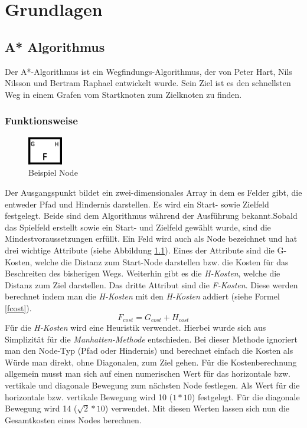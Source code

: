 \chapter{Grundlagen}
\section{A* Algorithmus}
Der A*-Algorithmus ist ein Wegfindungs-Algorithmus, der von Peter Hart, Nils Nilsson und Bertram Raphael entwickelt wurde. Sein Ziel ist es den schnellsten Weg in einem Grafen vom Startknoten zum Zielknoten zu finden. 
\subsection{Funktionsweise}
\begin{figure}
    \includegraphics[width=1.5cm]{assets/aStarNode.png}
    \caption{Beispiel Node}
    \label{fig:aStarNode}
\end{figure}
Der Ausgangspunkt bildet ein zwei-dimensionales Array in dem es Felder gibt, die entweder Pfad und Hindernis darstellen. Es wird ein Start- sowie Zielfeld festgelegt. Beide sind dem Algorithmus während der Ausführung bekannt.Sobald das Spielfeld erstellt sowie ein Start- und Zielfeld gewählt wurde, sind die Mindestvoraussetzungen erfüllt. Ein Feld wird auch als Node bezeichnet und hat drei wichtige Attribute (siehe Abbildung \ref{fig:aStarNode}). Eines der Attribute sind die G-Kosten, welche die Distanz zum Start-Node darstellen bzw. die Kosten für das Beschreiten des bisherigen Wegs. Weiterhin gibt es die \textit{H-Kosten}, welche die Distanz zum Ziel darstellen. Das dritte Attribut sind die \textit{F-Kosten}. Diese werden berechnet indem man die \textit{H-Kosten} mit den \textit{H-Kosten} addiert (siehe Formel \ref{fcost}).
\begin{equation}
F_{cost} = G_{cost} + H_{cost}
\label{fcost}
\end{equation}
Für die \textit{H-Kosten} wird eine Heuristik verwendet. Hierbei wurde sich aus Simplizität für die \textit{Manhatten-Methode} entschieden. Bei dieser Methode ignoriert man den Node-Typ (Pfad oder Hindernis) und berechnet einfach die Kosten als Würde man direkt, ohne Diagonalen, zum Ziel gehen. Für die Kostenberechnung allgemein musst man sich auf einen numerischen Wert für das horizontale bzw. vertikale und diagonale Bewegung zum nächsten Node festlegen. Als Wert für die horizontale bzw. vertikale Bewegung wird 10 ($1*10$) festgelegt. Für die diagonale Bewegung wird 14 ($\sqrt{2}*10$) verwendet. Mit diesen Werten lassen sich nun die Gesamtkosten eines Nodes berechnen.

